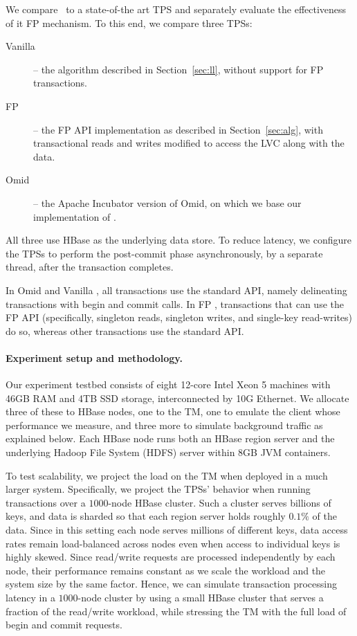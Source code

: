 We compare \sys\  to a state-of-the art TPS and separately evaluate the effectiveness of it FP mechanism.
To this end, we compare three TPSs: 
\begin{description}
\item[Vanilla \sys] -- the algorithm described in Section~\ref{sec:ll}, without support for FP transactions.
\item[FP \sys] -- the FP API implementation as described in Section~\ref{sec:alg},
with transactional reads and writes  modified to access the LVC along with the data.
\item[Omid] -- the Apache Incubator version of Omid, on which we base
our implementation of \sys. 
\end{description}

All three use HBase as the underlying data store. To reduce latency,
we configure the TPSs to perform the post-commit phase asynchronously, 
by a separate thread, after the transaction completes.

In Omid and Vanilla \sys, all transactions use the standard API, namely 
delineating transactions with begin and commit calls.
In FP \sys, transactions that can use the FP API (specifically, singleton reads, singleton writes, 
and single-key read-writes) do so, whereas other transactions use the standard API.

\paragraph{Experiment setup and methodology.}

Our experiment testbed consists of eight 12-core Intel Xeon 5 machines with 46GB RAM and 4TB 
SSD storage, interconnected by 10G Ethernet. We allocate three of these to HBase nodes, 
one to the TM, one to emulate the client whose performance we measure, and three more to simulate 
background traffic as explained below. Each HBase node runs both an HBase region server and 
the underlying Hadoop File System (HDFS) server within 8GB JVM containers. 

To test scalability, we project the load on the TM when deployed in a much larger system. 
Specifically, we project the TPSs' behavior when running transactions over a $1000$-node HBase cluster.
Such a cluster serves billions of keys, and data is sharded so that each region server 
holds roughly $0.1\%$ of the data.
Since in this setting each node serves millions of different keys, 
data access rates remain load-balanced across nodes 
even when access to individual keys is highly skewed. 
Since read/write requests are processed independently by each node, 
their performance remains constant as we scale the workload and the 
system size by the same factor. 
Hence, we can simulate transaction processing latency in 
a $1000$-node cluster
by using a small HBase cluster that serves a fraction of the read/write workload, 
while stressing the TM with the full load of begin and commit requests. 


